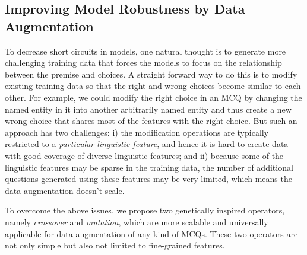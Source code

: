 \subsection{Improving Model Robustness by Data Augmentation}
\label{sec:aug}
To decrease short circuits in models, 
one natural thought is to generate more challenging training data that 
forces the models to focus on the relationship between the premise and choices.
A straight forward way to do this is to modify existing training data so that the 
right and wrong choices become similar to each other. For example, we could modify the 
right choice in an MCQ by
changing the named entity in it into another arbitrarily named entity and thus create a new
wrong choice that shares most of the features with the right choice.
But such an approach has two challenges: i) the modification operations are typically restricted to
a \textit{particular linguistic feature}, and hence it is hard to create data with good 
coverage of diverse
linguistic features; and ii) because some of the linguistic features may be sparse in the 
training data, the number of additional questions generated using these features may be very limited,
which means the data augmentation doesn't scale.

To overcome the above issues, 
we propose two genetically inspired operators, 
namely \textit{crossover} and \textit{mutation}, 
which are more scalable and universally applicable for data augmentation of any kind of
MCQs. These two operators are  
not only simple but also not limited to fine-grained features. 



